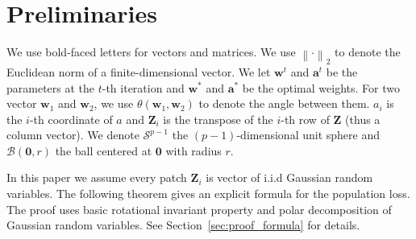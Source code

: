 \documentclass{article}
\newcommand{\secondlayer}{a}
\newcommand{\mat}[1]{\mathbf{#1}}
\newcommand{\vect}[1]{\mathbf{#1}}
\newcommand{\norm}[1]{\left\|#1\right\|}
\begin{document}
\section{Preliminaries}
\label{sec:pre}
We use bold-faced letters for vectors and matrices.
We use $\norm{\cdot}_2$ to denote the Euclidean norm of a finite-dimensional vector.
We let $\vect{w}^t$ and $\vect{\secondlayer}^t$ be the parameters at the $t$-th iteration and $\vect{w}^*$ and $\vect{\secondlayer}^*$ be the optimal weights.
For two vector $\vect{w}_1$ and $\vect{w}_2$, we use $\theta\left(\vect{w}_1,\vect{w}_2\right)$ to denote the angle between them.
$\secondlayer_i$ is the $i$-th coordinate of $\secondlayer$ and $\mat{Z}_i$ is the transpose of the $i$-th row of $\mat{Z}$ (thus a column vector).
We denote $\mathcal{S}^{p-1}$  the $(p-1)$-dimensional unit sphere and $\mathcal{B}\left(\vect{0},r\right)$ the ball centered at $\vect{0}$ with radius $r$.

In this paper we assume every patch $\mat{Z}_i$ is vector of i.i.d Gaussian random variables.
The following theorem gives an explicit formula for the population loss.
The proof uses basic rotational invariant property and polar decomposition of Gaussian random variables.
See Section~\ref{sec:proof_formula} for details.
\end{document}
